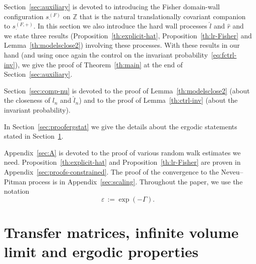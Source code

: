 \documentclass[AHL,Unicode,longabstracts,published]{cedram}
\newcommand{\bbZ}{\mathbb{Z}}
\newcommand{\gep}{\varepsilon}
\newcommand{\gG}{\Gamma}
\newcommand{\ls}{\widehat{l}}
\newcommand{\rs}{\widehat{r}}
\begin{document}
Section~\ref{sec:auxiliary} is devoted to introducing the Fisher domain-wall configuration $s^{(F)}_\cdot$ on $\bbZ$ that is the natural translationally covariant companion to $s^{(F, +)}_\cdot$. In this section we also introduce the hard wall processes $ \ls$ and $\rs$ and we state three results (Proposition~\ref{th:explicit-hat}, Proposition~\ref{th:lr-Fisher} and Lemma~\ref{th:modelsclose2}) involving these processes. With these results in our hand (and using once again the control on the invariant probability~\eqref{eq:fctrl-inv}), we give the proof of Theorem~\ref{th:main} at the end of Section~\ref{sec:auxiliary}.

Section~\ref{sec:comp-nu} is devoted to the proof of Lemma~\ref{th:modelsclose2} (about the closeness of $l_n$ and $\ls_n$) and to the proof of Lemma~\ref{th:ctrl-inv} (about the invariant probability).

In Section~\ref{sec:proofergstat} we give the details about the ergodic statements stated in Section~\ref{sec:tm-mainproof}.

Appendix~\ref{sec:A} is devoted to the proof of various random walk estimates we need. Proposition~\ref{th:explicit-hat} and Proposition~\ref{th:lr-Fisher} are proven in Appendix~\ref{sec:proofs-constrained}. The proof of the convergence to the Neveu--Pitman process is in Appendix~\ref{sec:scaling}. Throughout the paper, we use the notation
\begin{equation}\label{eq:epsilon}
\gep\,:= \exp(-\gG).
\end{equation}



\section{Transfer matrices, infinite volume limit and ergodic properties}\label{sec:tm-mainproof}
\end{document}
